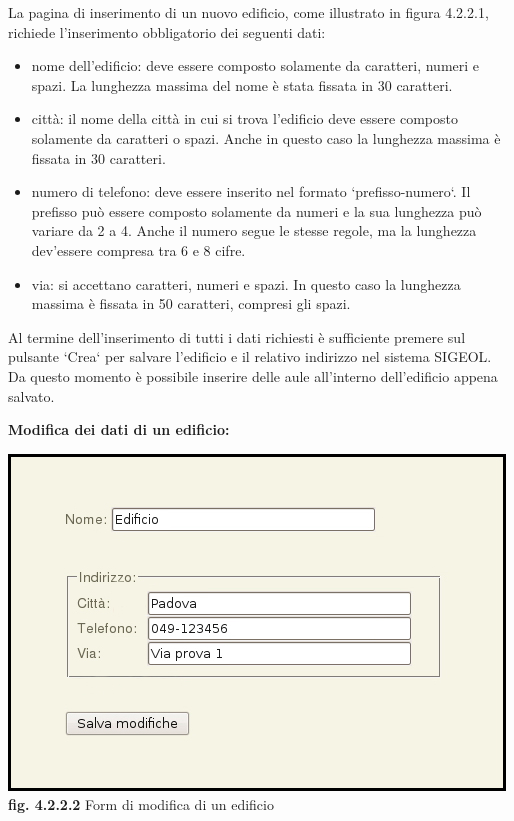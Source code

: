 \documentclass[11pt,a4paper]{article}
\begin{document}
La pagina di inserimento di un nuovo edificio, come illustrato in figura 4.2.2.1, richiede l'inserimento obbligatorio dei seguenti dati:
\begin{itemize}
 \item nome dell'edificio: deve essere composto solamente da caratteri, numeri e spazi. La lunghezza massima del nome è stata fissata in 30 caratteri.
 \item città: il nome della città in cui si trova l'edificio deve essere composto solamente da caratteri o spazi. Anche in questo caso la lunghezza massima è fissata in 30 caratteri.
 \item numero di telefono: deve essere inserito nel formato `prefisso-numero`. Il prefisso può essere composto solamente da numeri e la sua lunghezza può variare da 2 a 4. Anche il numero segue le stesse regole, ma la lunghezza dev'essere compresa tra 6 e 8 cifre.
 \item via: si accettano caratteri, numeri e spazi. In questo caso la lunghezza massima è fissata in 50 caratteri, compresi gli spazi.
\end{itemize}
Al termine dell'inserimento di tutti i dati richiesti è sufficiente premere sul pulsante `Crea` per salvare l'edificio e il relativo indirizzo nel sistema SIGEOL.
Da questo momento è possibile inserire delle aule all'interno dell'edificio appena salvato.
\newline \newline
\begin{large}\textbf{Modifica dei dati di un edificio:}\end{large}

\bigskip
\begin{center}
	\includegraphics[scale=0.5]{images/modifica_edificio.jpg}\\
	\textbf{fig. 4.2.2.2} Form di modifica di un edificio\\
\end{center}
\bigskip
\end{document}
